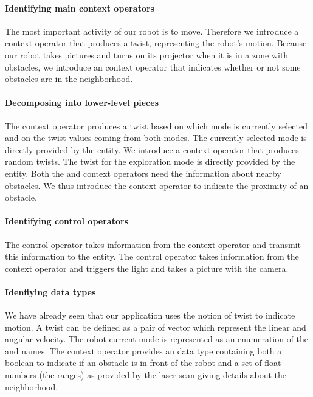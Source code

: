 \paragraph*{Identifying main context operators}
The most important activity of our robot is to move. Therefore we
introduce a  context operator that produces a twist,
representing the robot's motion. Because our robot takes pictures and
turns on its projector when it is in a zone with obstacles, we
introduce an  context operator that indicates whether
or not some obstacles are in the neighborhood.

\paragraph*{Decomposing into lower-level pieces}
The  context operator produces a twist based on which mode
is currently selected and on the twist values coming from both modes.
The currently selected mode is directly provided by the
 entity. We introduce a  context
operator that produces random twists. The twist for the exploration
mode is directly provided by the  entity. Both the
 and  context operators need the
information about nearby obstacles. We thus introduce the
 context operator to indicate the proximity of
an obstacle.

\paragraph*{Identifying control operators}
The  control operator takes information from the
 context operator and transmit this information to the
 entity. The  control operator takes
information from the  context operator and triggers the
light and takes a picture with the camera.

\paragraph*{Idenfiying data types}
We have already seen that our application uses the notion of twist to
indicate motion. A twist can be defined as a pair of vector which
represent the linear and angular velocity. The robot current mode is
represented as an enumeration of the  and 
names. The  context operator provides an
 data type containing both a boolean to indicate if an
obstacle is in front of the robot and a set of float numbers (the
ranges) as provided by the laser scan giving details about the
neighborhood.

